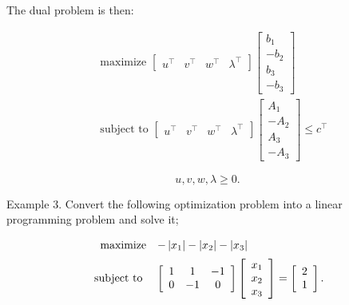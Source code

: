 The dual problem is then:

\begin{equation*}
	\begin{aligned}
		& \text { maximize }\left[\begin{array}{llll}
			u^{\top} & v^{\top} & w^{\top} & \lambda^{\top}
		\end{array}\right]\left[\begin{array}{c}
			b_{1} \\
			-b_{2} \\
			b_{3} \\
			-b_{3}
		\end{array}\right] \\
		& \text { subject to }\left[\begin{array}{llll}
			u^{\top} & v^{\top} & w^{\top} & \lambda^{\top}
		\end{array}\right]\left[\begin{array}{c}
			A_{1} \\
			-A_{2} \\
			A_{3} \\
			-A_{3}
		\end{array}\right] \leq c^{\top}
	\end{aligned}
\end{equation*}

\begin{equation*}
	u, v, w, \lambda \geq 0 .
\end{equation*}


\medskip
\noindent
Example 3. Convert the following optimization problem into a linear programming problem and solve it;

\[
	\begin{array}{rl}
		\text { maximize} & -\left|x_{1}\right|-\left|x_{2}\right|-\left|x_{3}\right| \vspace{2mm}\\
		\text { subject to } & {\left[\begin{array}{ccc}
				1 & 1 & -1 \\
				0 & -1 & 0
			\end{array}\right]\left[\begin{array}{l}
				x_{1} \\
				x_{2} \\
				x_{3}
			\end{array}\right]=\left[\begin{array}{l}
				2 \\
				1
			\end{array}\right] .}
	\end{array}
\]

